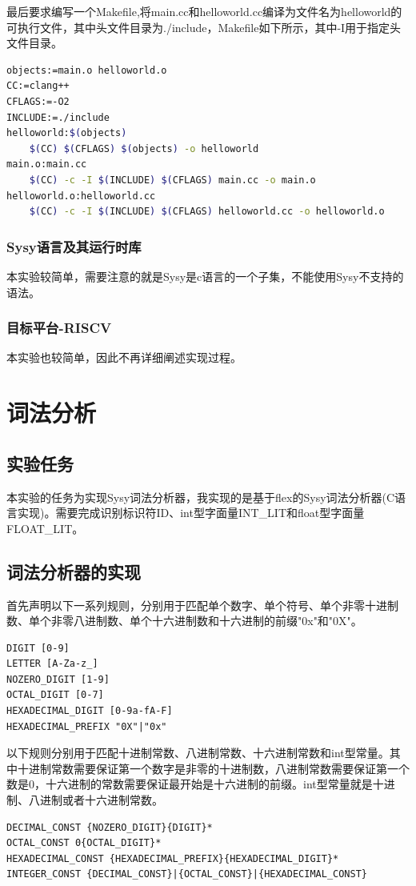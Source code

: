 \documentclass[supercite]{Experimental_Report}
\theoremstyle{definition}
\begin{document}
最后要求编写一个Makefile,将main.cc和helloworld.cc编译为文件名为helloworld的可执行文件，其中头文件目录为./include，Makefile如下所示，其中-I用于指定头文件目录。
\begin{center}
\begin{lstlisting}[language=bash]
objects:=main.o helloworld.o
CC:=clang++
CFLAGS:=-O2
INCLUDE:=./include
helloworld:$(objects)
	$(CC) $(CFLAGS) $(objects) -o helloworld
main.o:main.cc
	$(CC) -c -I $(INCLUDE) $(CFLAGS) main.cc -o main.o
helloworld.o:helloworld.cc
	$(CC) -c -I $(INCLUDE) $(CFLAGS) helloworld.cc -o helloworld.o
\end{lstlisting}
\end{center}
\subsubsection{Sysy语言及其运行时库}
本实验较简单，需要注意的就是Sysy是c语言的一个子集，不能使用Sysy不支持的语法。
\subsubsection{目标平台-RISCV}
本实验也较简单，因此不再详细阐述实现过程。
\newpage
\section{词法分析}
\subsection{实验任务}
本实验的任务为实现Sysy词法分析器，我实现的是基于flex的Sysy词法分析器(C语言实现)。需要完成识别标识符ID、int型字面量INT\_LIT和float型字面量FLOAT\_LIT。

\subsection{词法分析器的实现}
首先声明以下一系列规则，分别用于匹配单个数字、单个符号、单个非零十进制数、单个非零八进制数、单个十六进制数和十六进制的前缀"0x"和"0X"。
\begin{lstlisting}[float=htb]
DIGIT [0-9]
LETTER [A-Za-z_]
NOZERO_DIGIT [1-9]
OCTAL_DIGIT [0-7]
HEXADECIMAL_DIGIT [0-9a-fA-F]
HEXADECIMAL_PREFIX "0X"|"0x"
\end{lstlisting}

以下规则分别用于匹配十进制常数、八进制常数、十六进制常数和int型常量。其中十进制常数需要保证第一个数字是非零的十进制数，八进制常数需要保证第一个数是0，十六进制的常数需要保证最开始是十六进制的前缀。int型常量就是十进制、八进制或者十六进制常数。
\begin{lstlisting}[float=htb]
DECIMAL_CONST {NOZERO_DIGIT}{DIGIT}*
OCTAL_CONST 0{OCTAL_DIGIT}*
HEXADECIMAL_CONST {HEXADECIMAL_PREFIX}{HEXADECIMAL_DIGIT}*
INTEGER_CONST {DECIMAL_CONST}|{OCTAL_CONST}|{HEXADECIMAL_CONST}
\end{lstlisting}
\end{document}
